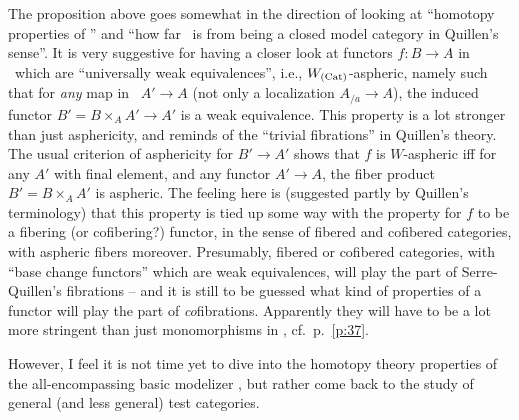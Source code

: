 The proposition above goes somewhat in the direction of looking at
``homotopy properties of \Cat'' and ``how far \Cat\ is from being a
closed model category in Quillen's sense''. It is very suggestive
for having a closer look at functors $f: B \to A$ in
\Cat\ which are ``universally weak equivalences'', i.e.,
$W_{(\mathrm{Cat})}$-aspheric, namely such that for \emph{any} map in \Cat\ $A'\to
A$ (not only a localization $A_{/a}\to A$), the induced functor
$B'=B\times_A A' \to A'$ is a weak equivalence. This property is a lot
stronger than just asphericity, and reminds of the ``trivial
fibrations'' in Quillen's theory. The usual criterion of asphericity
for $B'\to A'$ shows that $f$ is $W$-aspheric if{f} for any $A'$ with
final element, and any functor $A'\to A$, the fiber product
$B'=B\times_A A'$ is aspheric. The feeling here is (suggested partly
by Quillen's terminology) that this property is tied up some way with
the property for $f$ to be a fibering (or cofibering?) functor, in the
sense of fibered and cofibered categories, with aspheric fibers
moreover. Presumably, fibered or cofibered categories, with ``base
change functors'' which are weak equivalences, will play the part of
Serre-Quillen's fibrations -- and it is still to be guessed what kind
of properties of a functor will play the part of
\emph{co}fibrations. Apparently they will have to be a lot more
stringent than just monomorphisms in \Cat, cf.\ p.\ \ref{p:37}.

However, I feel it is not time yet to dive into the homotopy theory
properties of the all-encompassing basic modelizer \Cat, but rather
come back to the study of general (and less general) test categories.

